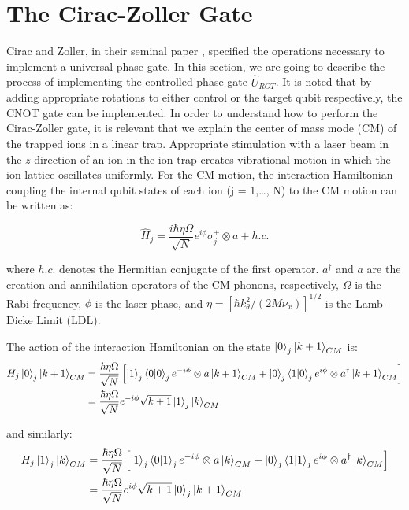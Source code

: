 \documentclass[../main.tex]{subfiles}
\begin{document}
\section{The Cirac-Zoller Gate}
Cirac and Zoller, in their seminal paper \cite{PhysRevLett.74.4091}, specified the operations necessary to implement a universal phase gate. In this section, we are going to describe the process of implementing the controlled phase gate $\hat{U}_{ROT}$. It is noted that by adding appropriate rotations to either control or the target qubit respectively, the CNOT gate can be implemented. In order to understand how to perform the Cirac-Zoller gate, it is relevant that we explain the center of mass mode (CM) of the trapped ions in a linear trap. Appropriate stimulation with a laser beam in the $z$-direction of an ion in the ion trap creates vibrational motion in which the ion lattice oscillates uniformly. For the CM motion, the interaction Hamiltonian coupling the internal qubit states of each ion (j = 1,\ldots, N) to the CM motion can be written as:

\begin{equation}
    \hat{H}_j = \frac{i\hbar\eta\Omega}{\sqrt{N}}e^{i\phi}\sigma_{j}^+ \otimes a + h.c.
\end{equation}

\noindent where $h.c.$ denotes the Hermitian conjugate of the first operator. $a^\dagger$ and $a$ are the creation and annihilation operators of the CM phonons, respectively, $\Omega$ is the Rabi frequency, $\phi$ is the laser phase, and $\eta = [\hbar k_\theta^2 / (2M\nu_x)]^{1/2}$ is the Lamb-Dicke Limit (LDL). 

The action of the interaction Hamiltonian on the state $\ket{0}_j\ket{k+1}_{CM}$ is:
\begin{equation}
    \begin{split}
        H_j\ket{0}_j\ket{k+1}_{CM} &= \frac{\hbar\eta\Omega}{\sqrt{N}}\left[\ket{1}_j\bra{0}\ket{0}_je^{-i\phi}\otimes a\ket{k+1}_{CM} + \ket{0}_j\bra{1}\ket{0}_je^{i\phi}\otimes a^\dagger\ket{k+1}_{CM}\right]\\
        &= \frac{\hbar\eta\Omega}{\sqrt{N}}e^{-i\phi}\sqrt{k+1}\ket{1}_j\ket{k}_{CM}
    \end{split}
\end{equation}

\noindent and similarly:
\begin{equation}
    \begin{split}
        H_j\ket{1}_j\ket{k}_{CM} &= \frac{\hbar\eta\Omega}{\sqrt{N}}\left[\ket{1}_j\bra{0}\ket{1}_je^{-i\phi}\otimes a\ket{k}_{CM} + \ket{0}_j\bra{1}\ket{1}_je^{i\phi}\otimes a^\dagger\ket{k}_{CM}\right]\\
        &= \frac{\hbar\eta\Omega}{\sqrt{N}}e^{i\phi}\sqrt{k+1}\ket{0}_j\ket{k+1}_{CM}
    \end{split}
\end{equation}
\end{document}
